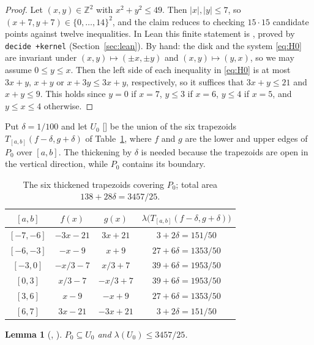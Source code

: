 \documentclass[11pt]{amsart}
\theoremstyle{plain}
\newtheorem{lemma}[theorem]{Lemma}
\theoremstyle{definition}
\newcommand{\Z}{\mathbb{Z}}
\newcommand{\vol}{\lambda}
\begin{document}
\begin{proof}
Let $(x,y)\in\Z^2$ with $x^2+y^2\le49$. Then $|x|,|y|\le7$, so $(x+7,y+7)\in\{0,\dots,14\}^2$, and the claim reduces to checking $15\cdot15$ candidate points against twelve inequalities. In Lean this finite statement is , proved by \texttt{decide +kernel} (Section~\ref{sec:lean}).
By hand: the disk and the system \eqref{eq:H0} are invariant under $(x,y)\mapsto(\pm x,\pm y)$ and $(x,y)\mapsto(y,x)$, so we may assume $0\le y\le x$. Then the left side of each inequality in \eqref{eq:H0} is at most $3x+y$, $x+y$ or $x+3y\le3x+y$, respectively, so it suffices that $3x+y\le21$ and $x+y\le9$. This holds since $y=0$ if $x=7$, $y\le3$ if $x=6$, $y\le4$ if $x=5$, and $y\le x\le4$ otherwise.
\end{proof}

Put $\delta=1/100$ and let $U_0$ [] be the union of the six trapezoids $T_{[a,b]}(f-\delta,g+\delta)$ of Table~\ref{tab:upper}, where $f$ and $g$ are the lower and upper edges of $P_0$ over $[a,b]$. The thickening by $\delta$ is needed because the trapezoids are open in the vertical direction, while $P_0$ contains its boundary.

\begin{table}[ht]
\centering\small
\begin{tabular}{cccc}
\toprule
$[a,b]$ & $f(x)$ & $g(x)$ & $\vol\bigl(T_{[a,b]}(f-\delta,g+\delta)\bigr)$\\
\midrule
$[-7,-6]$ & $-3x-21$ & $3x+21$ & $3+2\delta=151/50$\\
$[-6,-3]$ & $-x-9$ & $x+9$ & $27+6\delta=1353/50$\\
$[-3,0]$ & $-x/3-7$ & $x/3+7$ & $39+6\delta=1953/50$\\
$[0,3]$ & $x/3-7$ & $-x/3+7$ & $39+6\delta=1953/50$\\
$[3,6]$ & $x-9$ & $-x+9$ & $27+6\delta=1353/50$\\
$[6,7]$ & $3x-21$ & $-3x+21$ & $3+2\delta=151/50$\\
\bottomrule
\end{tabular}
\caption{The six thickened trapezoids covering $P_0$; total area $138+28\delta=3457/25$.}\label{tab:upper}
\end{table}

\begin{lemma}[, ]\label{lem:U0}
$P_0\subseteq U_0$ and $\vol(U_0)\le 3457/25$.
\end{lemma}
\end{document}
